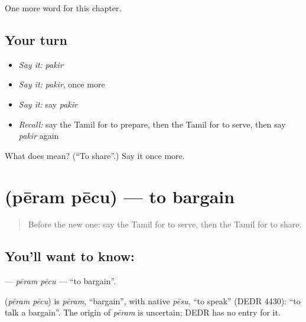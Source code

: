 \begin{grammarlens}[title={What you've built}]
One more word for this chapter.
\end{grammarlens}

\subsection*{Your turn}
\begin{itemize}
\raggedright
  \item \emph{Say it:} \emph{pakir}
  \item \emph{Say it:} \emph{pakir}, once more
  \item \emph{Say it:} say \emph{pakir}
  \item \emph{Recall:} say the Tamil for to prepare, then the Tamil for to serve, then say \emph{pakir} again
\end{itemize}

\begin{tcolorbox}[breakable,colback=teal!4,colframe=teal!35!black,title={Before you move on}]
What does  mean? (\textquotedblleft{}To share\textquotedblright{}.) Say it once more.
\end{tcolorbox}
\section[\texorpdfstring{\ta{பேரம்} \ta{பேசு} (pēram pēcu)}{பேரம் பேசு (pēram pēcu)}]{  (pēram pēcu) — to bargain}

\label{lesson:TA-C163-peram-pecu}



\begin{quote}
Before the new one: say the Tamil for to serve, then the Tamil for to share.
\end{quote}

\subsection*{You'll want to know:  }
\textbf{ } — \emph{pēram pēcu} — \textquotedblleft{}to bargain\textquotedblright{}.

\begin{cousinweb}
\textbf{ } (\emph{pēram pēcu}) is \emph{pēram}, \textquotedblleft{}bargain\textquotedblright{}, with native \emph{pēsu}, \textquotedblleft{}to speak\textquotedblright{} (DEDR 4430): \textquotedblleft{}to talk a bargain\textquotedblright{}. The origin of \emph{pēram} is uncertain; DEDR has no entry for it.
\end{cousinweb}

